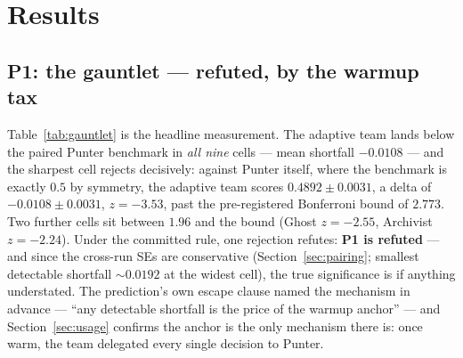 \documentclass[11pt]{article}
\begin{document}
\section{Results}
\label{sec:results}

\subsection{P1: the gauntlet --- refuted, by the warmup tax}
\label{sec:p1}

Table~\ref{tab:gauntlet} is the headline measurement. The adaptive team lands below the
paired Punter benchmark in \emph{all nine} cells --- mean shortfall $-0.0108$ --- and the
sharpest cell rejects decisively: against Punter itself, where the benchmark is exactly
$0.5$ by symmetry, the adaptive team scores $0.4892 \pm 0.0031$, a delta of
$-0.0108 \pm 0.0031$, $z = -3.53$, past the pre-registered Bonferroni bound of $2.773$.
Two further cells sit between $1.96$ and the bound (Ghost $z = -2.55$, Archivist
$z = -2.24$). Under the committed rule, one rejection refutes: \textbf{P1 is refuted} ---
and since the cross-run SEs are conservative (Section~\ref{sec:pairing}; smallest
detectable shortfall ${\sim}0.0192$ at the widest cell), the true significance is if
anything understated. The prediction's own escape clause named the mechanism in advance
--- ``any detectable shortfall is the price of the warmup anchor'' --- and
Section~\ref{sec:usage} confirms the anchor is the only mechanism there is: once warm,
the team delegated every single decision to Punter.
\end{document}
